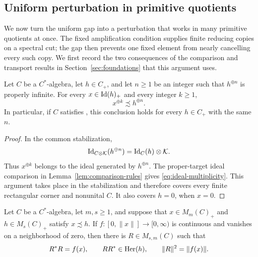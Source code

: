 \subsection{Uniform perturbation in primitive quotients}
\label{sec:perturbation}

We now turn the uniform gap into a perturbation that works in many
primitive quotients at once.  The fixed amplification condition
\propF{} supplies finite reducing copies on a spectral cut; the gap
then prevents one fixed element from nearly cancelling every such
copy.  We first record the two consequences of the comparison and
transport results in Section~\ref{sec:foundations} that this argument
uses.

\begin{lemma}
\label{lem:ideal-comparison}
Let \(C\) be a \(C^*\)-algebra, let \(h\in C_+\), and let \(n\geq1\)
be an integer such that \(h^{\oplus n}\) is properly infinite.
For every \(x\in\operatorname{Id}(h)_+\) and every integer \(k\geq1\),
\begin{equation}
 x^{\oplus k}\precsim h^{\oplus n}.
 \label{eq:ideal-multiplicity}
\end{equation}
In particular, if \(C\) satisfies \propF{}, this conclusion holds for
every \(h\in C_+\) with the same \(n\).
\end{lemma}

\begin{proof}
In the common stabilization,
\[
 \operatorname{Id}_{C\otimes\mathcal K}(h^{\oplus n})
   =\operatorname{Id}_C(h)\otimes\mathcal K.
\]
Thus \(x^{\oplus k}\) belongs to the ideal generated by
\(h^{\oplus n}\).  The proper-target ideal comparison in
Lemma~\ref{lem:comparison-rules} gives
\eqref{eq:ideal-multiplicity}.  This argument takes place in the
stabilization and therefore covers every finite rectangular corner
and nonunital \(C\).  It also covers \(h=0\), when \(x=0\).
\end{proof}

\begin{lemma}
\label{lem:cut-implementation}
Let \(C\) be a \(C^*\)-algebra, let \(m,s\geq1\), and suppose that
\(x\in M_m(C)_+\) and \(h\in M_s(C)_+\) satisfy \(x\precsim h\).
If \(f\colon[0,\|x\|]\to[0,\infty)\) is continuous and vanishes
on a neighborhood of zero, then there is \(R\in M_{s,m}(C)\) such that
\begin{equation}
 R^*R=f(x),\qquad RR^*\in\operatorname{Her}(h),\qquad
 \|R\|^2=\|f(x)\|.
 \label{eq:exact-cut}
\end{equation}
\end{lemma}

